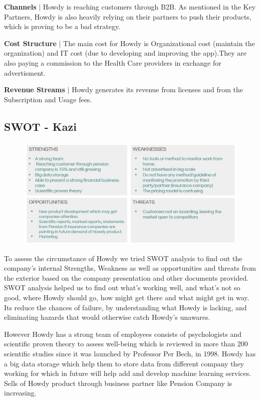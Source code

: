 \noindent \textbf{Channels} $|$ Howdy is reaching customers through B2B. As mentioned in the Key Partners, Howdy is also heavily relying on their partners to push their products, which is proving to be a bad strategy. 

\noindent \textbf{Cost Structure} $|$ The main cost for Howdy is Organizational cost (maintain the organization) and IT cost (due to developing and improving the app).They are also paying a commission to the Health Care providers in exchange for advertisment. 

\noindent \textbf{Revenue Streams} $|$ Howdy generates its revenue from licenses and from the Subscription and Usage fees.



\subsection{SWOT - Kazi}

\begin{figure}[H]
\includegraphics[width=14cm]{figures/SWOT.png}
\centering
\end{figure}
To assess the circumstance of Howdy we tried SWOT analysis to find out the company’s internal Strengths, Weakness as well as opportunities and threats from the exterior based on the company presentation and other documents provided. SWOT analysis helped us to find out what's working well, and what's not so good, where Howdy should go, how might get there and what might get in way. Its reduce the chances of failure, by understanding what Howdy is lacking, and eliminating hazards that would otherwise catch Howdy’s unawares.

\noindent However Howdy has a strong team of employees consists of psychologists and scientific proven theory to assess well-being which is reviewed in more than 200 scientific studies since it was launched by Professor Per Bech, in 1998. Howdy has a big data storage which help them to store data from different company they working for which in future will help add and develop machine learning services. Sells of Howdy product through business partner like Pension Company is increasing.

